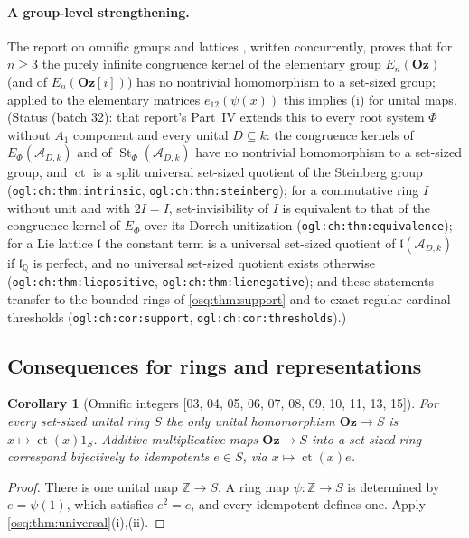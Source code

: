 \documentclass[11pt,letterpaper]{article}
\numberwithin{equation}{section}
\newtheorem{corollary}[corollary]{Corollary}
\theoremstyle{definition}
\theoremstyle{remark}
\theoremstyle{plain}
\newcommand{\Oz}{\mathbf{Oz}}
\newcommand{\GOz}{\Oz[i]}
\newcommand{\Z}{\mathbb Z}
\newcommand{\Q}{\mathbb Q}
\newcommand{\A}{\mathcal A}          %
\newcommand{\ct}{\operatorname{ct}}
\newcommand{\src}[1]{\textup{\textsf{[#1]}}}
\begin{document}
\paragraph{A group-level strengthening.} The report on omnific groups and lattices \cite{RepoOgl}, written
concurrently, proves that for $n\ge3$ the purely infinite congruence kernel of the elementary group
$E_n(\Oz)$ (and of $E_n(\GOz)$) has no nontrivial homomorphism to a set-sized group; applied to the elementary
matrices $e_{12}(\psi(x))$ this implies (i) for unital maps. (Status (batch 32): that report's Part~IV extends
this to every root system $\Phi$ without $A_1$ component and every unital $D\subseteq k$: the congruence kernels of
$E_\Phi(\A_{D,k})$ and of $\operatorname{St}_\Phi(\A_{D,k})$ have no nontrivial homomorphism to a set-sized group, and $\ct$ is a
split universal set-sized quotient of the Steinberg group (\nolinkurl{ogl:ch:thm:intrinsic},
\nolinkurl{ogl:ch:thm:steinberg}); for a commutative ring $I$ without unit and with $2I=I$, set-invisibility of $I$
is equivalent to that of the congruence kernel of $E_\Phi$ over its Dorroh unitization
(\nolinkurl{ogl:ch:thm:equivalence}); for a Lie lattice $\mathfrak l$ the constant term is a universal set-sized
quotient of $\mathfrak l(\A_{D,k})$ if $\mathfrak l_\Q$ is perfect, and no universal set-sized quotient exists
otherwise (\nolinkurl{ogl:ch:thm:liepositive}, \nolinkurl{ogl:ch:thm:lienegative}); and these statements transfer
to the bounded rings of \cref{osq:thm:support} and to exact regular-cardinal thresholds
(\nolinkurl{ogl:ch:cor:support}, \nolinkurl{ogl:ch:cor:thresholds}).)

\subsection{Consequences for rings and representations}\label{osq:sub:consequences}

\begin{corollary}[Omnific integers \src{03, 04, 05, 06, 07, 08, 09, 10, 11, 13, 15}]\label{osq:cor:Oz}
For every set-sized unital ring $S$ the only unital homomorphism $\Oz\to S$ is
$x\mapsto\ct(x)1_S$. Additive multiplicative maps $\Oz\to S$ into a set-sized ring
correspond bijectively to idempotents $e\in S$, via $x\mapsto\ct(x)e$.
\end{corollary}
\begin{proof}
There is one unital map $\Z\to S$. A ring map $\psi:\Z\to S$ is determined by
$e=\psi(1)$, which satisfies $e^2=e$, and every idempotent defines one. Apply
\cref{osq:thm:universal}(i),(ii).
\end{proof}
\end{document}
